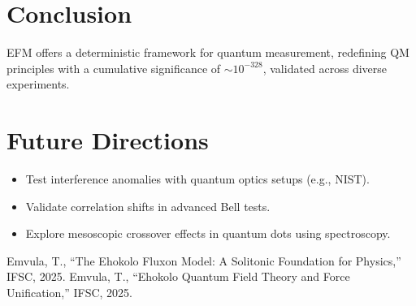 \documentclass{article}
\begin{document}
\section{Conclusion}
EFM offers a deterministic framework for quantum measurement, redefining QM principles with a cumulative significance of \(\sim 10^{-328}\), validated across diverse experiments.

\section{Future Directions}
\begin{itemize}
    \item Test interference anomalies with quantum optics setups (e.g., NIST).
    \item Validate correlation shifts in advanced Bell tests.
    \item Explore mesoscopic crossover effects in quantum dots using spectroscopy.
\end{itemize}

\begin{thebibliography}{2}
 Emvula, T., ``The Ehokolo Fluxon Model: A Solitonic Foundation for Physics,'' IFSC, 2025.
 Emvula, T., ``Ehokolo Quantum Field Theory and Force Unification,'' IFSC, 2025.
\end{thebibliography}
\end{document}
